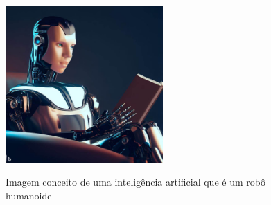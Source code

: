 \begin{figure}[ht]
	\caption{Imagem conceito de uma inteligência artificial que é um robô humanoide}
	\centering %
	\includegraphics[width=6cm]{figures/ia_concept.jpg} %
	\label{fig:ia_concept}
\end{figure}




